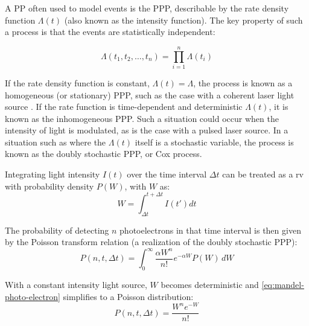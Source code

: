 A \gls{PP} often used to model events is the \gls{PPP}, describable by the rate density function $\Lambda(t)$ (also known as the intensity function). The key property of such a process is that the events are statistically independent:

\begin{equation}
    \Lambda(t_1, t_2, \dots, t_n) = \prod_{i=1}^{n} \Lambda(t_i)
\end{equation}

If the rate density function is constant, $\Lambda(t) = \Lambda$, the process is known as a homogeneous (or stationary) \gls{PPP}, such as the case with a coherent laser light source \cite{salehPhotoelectronStatistics1978}. If the rate function is time-dependent and deterministic $\Lambda(t)$, it is known as the inhomogeneous \gls{PPP}. Such a situation could occur when the intensity of light is modulated, as is the case with a pulsed laser source. In a situation such as where the $\Lambda(t)$ itself is a stochastic variable, the process is known as the doubly stochastic \gls{PPP}, or Cox process. 


Integrating light intensity $I(t)$ over the time interval $\Delta t$ can be treated as a \gls{rv} with probability density $P(W)$, with $W$ as:
\begin{equation}
    W = \int_{\Delta t}^{t+\Delta t} I(t') dt
\end{equation}

The probability of detecting $n$ photoelectrons in that time interval is then given by the Poisson transform relation \cite{mehtaVIIITheoryPhotoelectron1970} (a realization of the doubly stochastic \gls{PPP}):
\begin{equation}\label{eq:mandel-photo-electron}
    P(n, t, \Delta t) = \int_{0}^{\infty} \frac{\alpha W^n}{n!} e^{-\alpha W} P(W) \, dW
\end{equation}

With a constant intensity light source, $W$ becomes deterministic and \cref{eq:mandel-photo-electron} simplifies to a Poisson distribution:
\begin{equation}
    P(n, t, \Delta t) = \frac{W^n e^{-W}}{n!} 
\end{equation}

